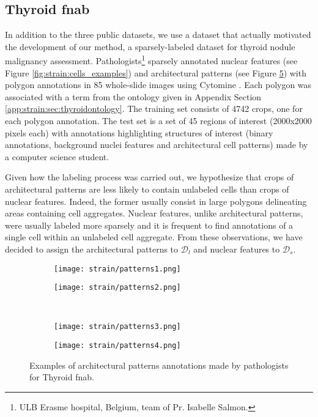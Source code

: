 \subsection{Thyroid \acrshort{fnab}}
\label{ssec:strain:thyroidfnab}

In addition to the three public datasets, we use a dataset that actually motivated the development of our method, a sparsely-labeled dataset for thyroid nodule malignancy assessment. Pathologists\footnote{ULB Erasme hospital, Belgium, team of Pr. Isabelle Salmon.} sparsely annotated nuclear features (see Figure \ref{fig:strain:cells_examples}) and architectural patterns (see Figure \ref{fig:strain:patterns_examples}) with polygon annotations in 85 whole-slide images using Cytomine \cite{maree2016collaborative}. Each polygon was associated with a term from the ontology given in Appendix Section \ref{app:strain:sec:thyroidontology}. The training set consists of 4742 crops, one for each polygon annotation. The test set is a set of 45 regions of interest (2000x2000 pixels each) with annotations highlighting structures of interest (binary annotations, background \vs nuclei features and architectural cell patterns) made by a computer science student.

Given how the labeling process was carried out, we hypothesize that crops of architectural patterns are less likely to contain unlabeled cells than crops of nuclear features. Indeed, the former usually consist in large polygons delineating areas containing cell aggregates. Nuclear features, unlike architectural patterns, were usually labeled more sparsely and it is frequent to find annotations of a single cell within an unlabeled cell aggregate. From these observations, we have decided to assign the architectural patterns to $\mathcal{D}_l$ and nuclear features to $\mathcal{D}_s$.


\begin{figure}
    \centering
    \begin{subfigure}{.48\textwidth}
      \centering
      \texttt{[image: strain/patterns1.png]}
      \caption{}
      \label{sfig:strain:pattern1}
    \end{subfigure}
    \begin{subfigure}{.48\textwidth}
      \centering
      \texttt{[image: strain/patterns2.png]}
      \caption{}
      \label{sfig:strain:pattern2}
    \end{subfigure} \\
    \begin{subfigure}{.48\textwidth}
      \centering
      \texttt{[image: strain/patterns3.png]}
      \caption{}
      \label{sfig:strain:pattern3}
    \end{subfigure}
    \begin{subfigure}{.48\textwidth}
      \centering
      \texttt{[image: strain/patterns4.png]}
      \caption{}
      \label{sfig:strain:pattern4}
    \end{subfigure}
    \caption{Examples of architectural patterns annotations made by pathologists for Thyroid \acrshort{fnab}.}
    \label{fig:strain:patterns_examples}
\end{figure}


